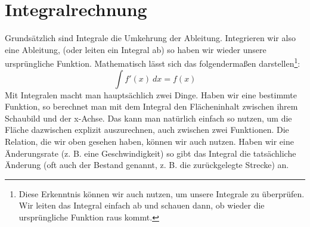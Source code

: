 \section{Integralrechnung}
Grundsätzlich sind Integrale die Umkehrung der Ableitung. Integrieren wir also eine Ableitung, (oder leiten ein Integral ab) so haben wir wieder unsere ursprüngliche Funktion. Mathematisch lässt sich das folgendermaßen darstellen\footnote{Diese Erkenntnis können wir auch nutzen, um unsere Integrale zu überprüfen. Wir leiten das Integral einfach ab und schauen dann, ob wieder die ursprüngliche Funktion raus kommt.}:
\[\int f'(x)\ dx=f(x)\]
Mit Integralen macht man hauptsächlich zwei Dinge. Haben wir eine bestimmte Funktion, so berechnet man mit dem Integral den Flächeninhalt zwischen ihrem Schaubild und der x-Achse. Das kann man natürlich einfach so nutzen, um die Fläche dazwischen explizit auszurechnen, auch zwischen zwei Funktionen. Die Relation, die wir oben gesehen haben, können wir auch nutzen. Haben wir eine Änderungsrate (z. B. eine Geschwindigkeit) so gibt das Integral die tatsächliche Änderung (oft auch der Bestand genannt, z. B. die zurückgelegte Strecke) an.










